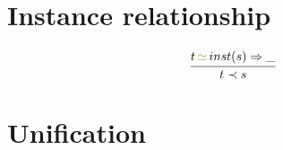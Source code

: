 \documentclass[11pt,a4paper]{article}
\newcommand{\unify}[3]{#1\,{\color{brown}{\simeq}}\,#2 \Rightarrow #3}
\newcommand{\type}{\tau}
\newcommand{\scheme}{\delta}
\begin{document}
\section{Instance relationship}
\vspace{-25pt}
\begin{flushright}
\framebox{ $\type \prec \scheme$}
\end{flushright}
\[
	\cfrac{ \unify{t}{inst(s)}{\_}}{t \prec s}
\]

\section{Unification}
\vspace{-25pt}
\begin{flushright}
\framebox{ $\unify{\type_1}{\type_2}{\rho}$}
\end{flushright}
\end{document}
